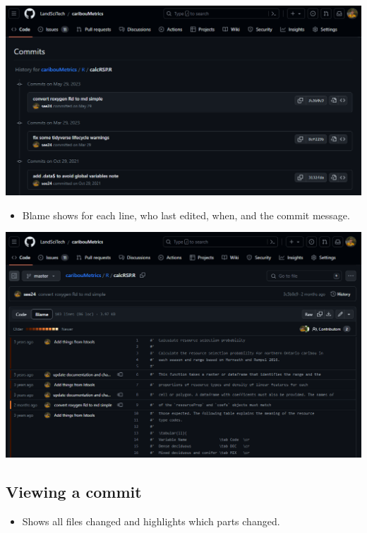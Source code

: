 \documentclass[
  letterpaper,
  DIV=11,
  numbers=noendperiod]{scrreprt}
\providecommand{\tightlist}{%
  \setlength{\itemsep}{0pt}\setlength{\parskip}{0pt}}\usepackage{longtable,booktabs,array}
\begin{document}
\includegraphics{assets/img/history.png}

\begin{itemize}
\tightlist
\item
  Blame shows for each line, who last edited, when, and the commit
  message.
\end{itemize}

\includegraphics{assets/img/blame.png}

\hypertarget{viewing-a-commit}{%
\subsection{Viewing a commit}\label{viewing-a-commit}}

\begin{itemize}
\tightlist
\item
  Shows all files changed and highlights which parts changed.
\end{itemize}
\end{document}
